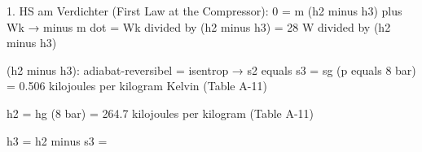1. HS am Verdichter (First Law at the Compressor):  
0 = m (h2 minus h3) plus Wk  
→ minus m dot = Wk divided by (h2 minus h3) = 28 W divided by (h2 minus h3)  

(h2 minus h3):  
adiabat-reversibel = isentrop → s2 equals s3 = sg (p equals 8 bar) = 0.506 kilojoules per kilogram Kelvin (Table A-11)  

h2 = hg (8 bar) = 264.7 kilojoules per kilogram (Table A-11)  

h3 =  
h2 minus  
s3 =